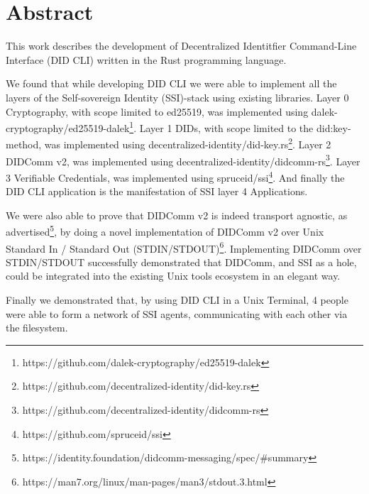 \chapter*{Abstract}

This work describes the development of Decentralized Identitfier Command-Line Interface (DID CLI) written in the Rust programming language.

We found that while developing DID CLI we were able to implement all the layers of the Self-sovereign Identity (SSI)-stack using existing libraries. Layer 0 Cryptography, with scope limited to ed25519, was implemented using \newline dalek-cryptography/ed25519-dalek\footnote{https://github.com/dalek-cryptography/ed25519-dalek}. Layer 1 DIDs, with scope limited to the did:key-method, was implemented using decentralized-identity/did-key.rs\footnote{https://github.com/decentralized-identity/did-key.rs}. Layer 2 DIDComm v2, was implemented using decentralized-identity/didcomm-rs\footnote{https://github.com/decentralized-identity/didcomm-rs}.
Layer 3 Verifiable Credentials, was implemented using spruceid/ssi\footnote{https://github.com/spruceid/ssi}. And finally the DID CLI application is the manifestation of SSI layer 4 Applications.

We were also able to prove that DIDComm v2 is indeed transport agnostic, as advertised\footnote{https://identity.foundation/didcomm-messaging/spec/\#summary}, by doing a novel implementation of DIDComm v2 over Unix Standard In / Standard Out (STDIN/STDOUT)\footnote{https://man7.org/linux/man-pages/man3/stdout.3.html}. Implementing DIDComm over \newline STDIN/STDOUT successfully demonstrated that DIDComm, and SSI as a hole, could be integrated into the existing Unix tools ecosystem in an elegant way.

Finally we demonstrated that, by using DID CLI in a Unix Terminal, 4 people were able to form a network of SSI agents, communicating with each other via the filesystem.